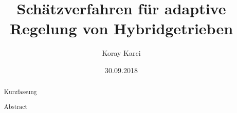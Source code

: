 \documentclass[thesis=master, language=german, paper=a4]{isys}[2013/06/28]
\title{Schätzverfahren für adaptive Regelung von Hybridgetrieben}
\author{Koray Karci}
\date{30.09.2018}		%
\begin{document}
\maketitle




	
\begin{abstract}
Kurzfassung
\end{abstract}

\newpage
\begin{otherlanguage}{english}
\begin{abstract}
Abstract 
\end{abstract}
\end{otherlanguage}


	
	
\setcounter{tocdepth}{1} %
\cleardoublepage
{}
\tableofcontents



\end{document}
